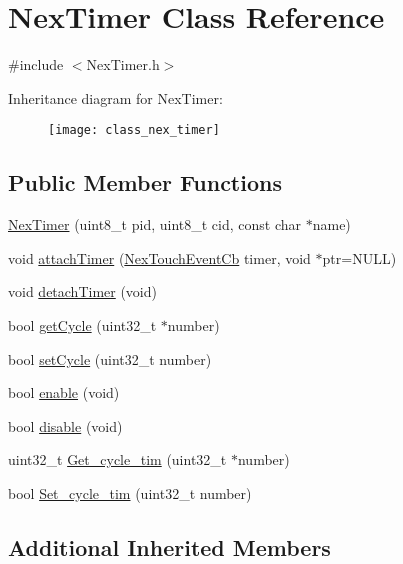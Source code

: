 \hypertarget{class_nex_timer}{\section{Nex\+Timer Class Reference}
\label{class_nex_timer}
}


{\ttfamily \#include $<$Nex\+Timer.\+h$>$}

Inheritance diagram for Nex\+Timer\+:\begin{figure}[H]
\begin{center}
\leavevmode
\texttt{[image: class\_nex\_timer]}
\end{center}
\end{figure}
\subsection*{Public Member Functions}
\begin{DoxyCompactItemize}
\item 
\hyperlink{class_nex_timer_a5cb6cdcf0d7e46723364d486d4dcd650}{Nex\+Timer} (uint8\+\_\+t pid, uint8\+\_\+t cid, const char $\ast$name)
\item 
void \hyperlink{class_nex_timer_ae6f1ae95ef40b8bc6f482185b1ec5175}{attach\+Timer} (\hyperlink{group___touch_event_ga162dea47b078e8878d10d6981a9dd0c6}{Nex\+Touch\+Event\+Cb} timer, void $\ast$ptr=N\+U\+L\+L)
\item 
void \hyperlink{class_nex_timer_a365d08df4623ce8a146e73ff9204d5cb}{detach\+Timer} (void)
\item 
bool \hyperlink{class_nex_timer_afd95e7490e28e2a36437be608f26b40e}{get\+Cycle} (uint32\+\_\+t $\ast$number)
\item 
bool \hyperlink{class_nex_timer_acf20f76949ed43f05b1c33613dabcb01}{set\+Cycle} (uint32\+\_\+t number)
\item 
bool \hyperlink{class_nex_timer_a01c146befad40fc0321891ac69e75710}{enable} (void)
\item 
bool \hyperlink{class_nex_timer_ae016d7d39ede6cf813221b26691809f1}{disable} (void)
\item 
uint32\+\_\+t \hyperlink{class_nex_timer_ae186b1c014e8bf67036f8a5faf73ae67}{Get\+\_\+cycle\+\_\+tim} (uint32\+\_\+t $\ast$number)
\item 
bool \hyperlink{class_nex_timer_a30829813c0c42680c1f7bcf5fc5b7c8b}{Set\+\_\+cycle\+\_\+tim} (uint32\+\_\+t number)
\end{DoxyCompactItemize}
\subsection*{Additional Inherited Members}


